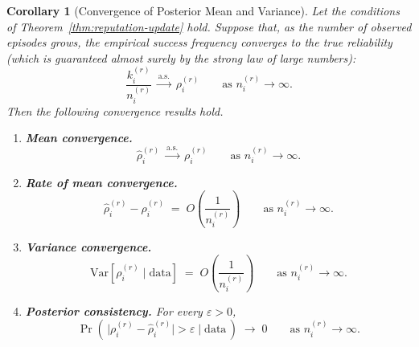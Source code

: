 \documentclass[12pt,openany]{book}
\numberwithin{equation}{chapter}
\theoremstyle{plain}
\newtheorem{corollary}[theorem]{Corollary}
\theoremstyle{definition}
\theoremstyle{remark}
\numberwithin{equation}{chapter}
\theoremstyle{plain}
\begin{document}
\begin{corollary}[Convergence of Posterior Mean and Variance]
\label{cor:posterior-convergence}
Let the conditions of Theorem~\ref{thm:reputation-update} hold.
Suppose that, as the number of observed episodes grows,
the empirical success frequency converges to the true reliability
(which is guaranteed almost surely by the strong law of large
numbers):
\begin{equation}
  \frac{k_i^{(r)}}{n_i^{(r)}}
  \;\xrightarrow{\mathrm{a.s.}}\;
  \rho_i^{(r)}
  \qquad\text{as } n_i^{(r)} \to \infty.
  \label{eq:slln}
\end{equation}
Then the following convergence results hold.
\begin{enumerate}
  \item[\textup{(i)}] \textbf{Mean convergence.}
        \begin{equation}
          \hat{\rho}_i^{(r)}
          \;\xrightarrow{\mathrm{a.s.}}\;
          \rho_i^{(r)}
          \qquad\text{as } n_i^{(r)} \to \infty.
          \label{eq:posterior-convergence}
        \end{equation}

  \item[\textup{(ii)}] \textbf{Rate of mean convergence.}
        \begin{equation}
          \hat{\rho}_i^{(r)} - \rho_i^{(r)}
          \;=\;
          O\!\left(\frac{1}{n_i^{(r)}}\right)
          \qquad\text{as } n_i^{(r)} \to \infty.
          \label{eq:mean-rate}
        \end{equation}

  \item[\textup{(iii)}] \textbf{Variance convergence.}
        \begin{equation}
          \mathrm{Var}\!\left[\rho_i^{(r)} \mid \mathrm{data}\right]
          \;=\;
          O\!\left(\frac{1}{n_i^{(r)}}\right)
          \qquad\text{as } n_i^{(r)} \to \infty.
          \label{eq:var-rate}
        \end{equation}

  \item[\textup{(iv)}] \textbf{Posterior consistency.}
        For every $\varepsilon > 0$,
        \begin{equation}
          \Pr\!\left(\,
            \bigl|\rho_i^{(r)} - \hat{\rho}_i^{(r)}\bigr|
            > \varepsilon \;\Big|\; \mathrm{data}
          \,\right)
          \;\longrightarrow\; 0
          \qquad\text{as } n_i^{(r)} \to \infty.
          \label{eq:posterior-consistency}
        \end{equation}
\end{enumerate}
\end{corollary}
\end{document}

